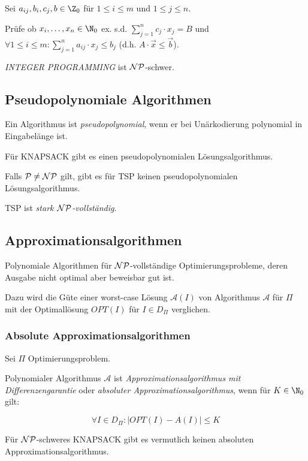 Sei $a_{ij}, b_i, c_j, b \in \Z_0$ für $1 \leq i \leq m$ und $1 \leq j \leq n$.

Prüfe ob $x_i, \dots, x_n \in \N_0$ ex. s.d. $\sum_{j=1}^n c_j \cdot x_j = B$ und $\forall 1 \leq i \leq m : \sum_{j=1}^n a_{ij} \cdot x_j \leq b_j$ (d.h. $A \cdot \vec{x} \leq \vec{b}$).

\emph{INTEGER PROGRAMMING} ist $\mathcal{NP}$-schwer.

\subsection*{Pseudopolynomiale Algorithmen}

Ein Algorithmus ist \emph{pseudopolynomial}, wenn er bei Unärkodierung polynomial in Eingabelänge ist.

\spacing

Für KNAPSACK gibt es einen pseudopolynomialen Lösungsalgorithmus.

Falls $\mathcal{P} \neq \mathcal{NP}$ gilt, gibt es für TSP keinen pseudopolynomialen Lösungsalgorithmus.

TSP ist \emph{stark $\mathcal{NP}$-vollständig}.

\subsection*{Approximationsalgorithmen}

Polynomiale Algorithmen für $\mathcal{NP}$-vollständige Optimierungsprobleme, deren Ausgabe nicht optimal aber beweisbar gut ist.

\spacing

Dazu wird die Güte einer worst-case Lösung $\mathcal{A}(I)$ von Algorithmus $\mathcal{A}$ für $\Pi$ mit der Optimallösung $OPT(I)$ für $I \in D_\Pi$ verglichen.

\subsubsection*{Absolute Approximationsalgorithmen}

Sei $\Pi$ Optimierungsproblem.

Polynomialer Algorithmus $\mathcal{A}$ ist \emph{Approximationsalgorithmus mit Differenzengarantie} oder \emph{absoluter Approximationsalgorithmus}, wenn für $K \in \N_0$ gilt:

\vspace*{-2mm}
\[ \forall I \in D_\Pi : | OPT(I) - A(I) | \leq K \]

Für $\mathcal{NP}$-schweres KNAPSACK gibt es vermutlich keinen absoluten Approximationsalgorithmus.

